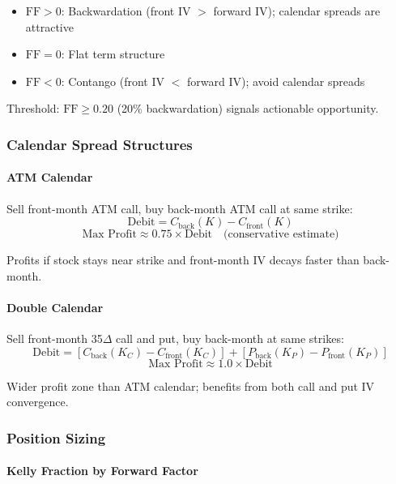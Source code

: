 \begin{itemize}
  \item $\text{FF} > 0$: Backwardation (front IV $>$ forward IV); calendar spreads are attractive
  \item $\text{FF} = 0$: Flat term structure
  \item $\text{FF} < 0$: Contango (front IV $<$ forward IV); avoid calendar spreads
\end{itemize}

Threshold: $\text{FF} \geq 0.20$ (20\% backwardation) signals actionable opportunity.

\subsubsection{Calendar Spread Structures}

\paragraph{ATM Calendar}

Sell front-month ATM call, buy back-month ATM call at same strike:
\[
\text{Debit} = C_{\text{back}}(K) - C_{\text{front}}(K)
\]
\[
\text{Max Profit} \approx 0.75 \times \text{Debit} \quad \text{(conservative estimate)}
\]

Profits if stock stays near strike and front-month IV decays faster than back-month.

\paragraph{Double Calendar}

Sell front-month 35$\Delta$ call and put, buy back-month at same strikes:
\[
\text{Debit} = [C_{\text{back}}(K_C) - C_{\text{front}}(K_C)] + [P_{\text{back}}(K_P) - P_{\text{front}}(K_P)]
\]
\[
\text{Max Profit} \approx 1.0 \times \text{Debit}
\]

Wider profit zone than ATM calendar; benefits from both call and put IV convergence.

\subsubsection{Position Sizing}

\paragraph{Kelly Fraction by Forward Factor}

